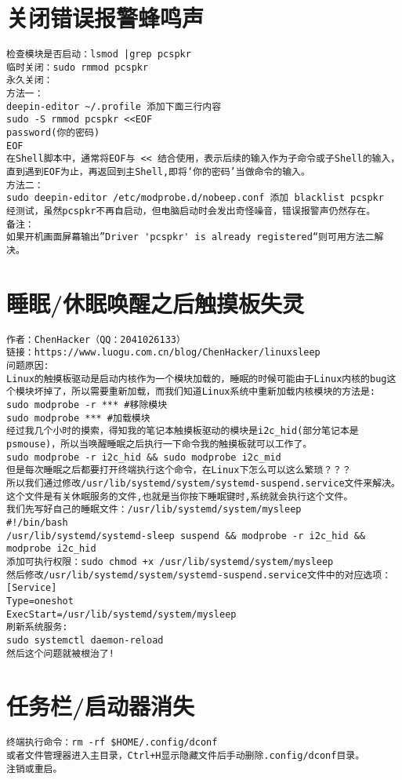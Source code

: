 \documentclass[a4paper,fontset=fandol,zihao=-4,linespread=1.2]{ctexbook}
\begin{document}
\section{关闭错误报警蜂鸣声}
\begin{lstlisting}
检查模块是否启动：lsmod |grep pcspkr
临时关闭：sudo rmmod pcspkr
永久关闭：
方法一：
deepin-editor ~/.profile 添加下面三行内容
sudo -S rmmod pcspkr <<EOF
password(你的密码)
EOF
在Shell脚本中，通常将EOF与 << 结合使用，表示后续的输入作为子命令或子Shell的输入，直到遇到EOF为止，再返回到主Shell,即将‘你的密码’当做命令的输入。
方法二：
sudo deepin-editor /etc/modprobe.d/nobeep.conf 添加 blacklist pcspkr
经测试，虽然pcspkr不再自启动，但电脑启动时会发出奇怪噪音，错误报警声仍然存在。
备注：
如果开机画面屏幕输出”Driver 'pcspkr' is already registered“则可用方法二解决。
\end{lstlisting}

\section{睡眠/休眠唤醒之后触摸板失灵}
\begin{lstlisting}
作者：ChenHacker（QQ：2041026133）
链接：https://www.luogu.com.cn/blog/ChenHacker/linuxsleep
问题原因:
Linux的触摸板驱动是启动内核作为一个模块加载的，睡眠的时候可能由于Linux内核的bug这个模块坏掉了，所以需要重新加载，而我们知道Linux系统中重新加载内核模块的方法是:
sudo modprobe -r *** #移除模块
sudo modprobe *** #加载模块
经过我几个小时的摸索，得知我的笔记本触摸板驱动的模块是i2c_hid(部分笔记本是psmouse)，所以当唤醒睡眠之后执行一下命令我的触摸板就可以工作了。
sudo modprobe -r i2c_hid && sudo modprobe i2c_mid
但是每次睡眠之后都要打开终端执行这个命令，在Linux下怎么可以这么繁琐？？？
所以我们通过修改/usr/lib/systemd/system/systemd-suspend.service文件来解决。
这个文件是有关休眠服务的文件,也就是当你按下睡眠键时,系统就会执行这个文件。
我们先写好自己的睡眠文件：/usr/lib/systemd/system/mysleep
#!/bin/bash
/usr/lib/systemd/systemd-sleep suspend && modprobe -r i2c_hid && modprobe i2c_hid
添加可执行权限：sudo chmod +x /usr/lib/systemd/system/mysleep
然后修改/usr/lib/systemd/system/systemd-suspend.service文件中的对应选项：
[Service]
Type=oneshot
ExecStart=/usr/lib/systemd/system/mysleep
刷新系统服务:
sudo systemctl daemon-reload
然后这个问题就被根治了!
\end{lstlisting}

\section{任务栏/启动器消失} \label{section:dock_disappear}
\begin{lstlisting}
终端执行命令：rm -rf $HOME/.config/dconf
或者文件管理器进入主目录，Ctrl+H显示隐藏文件后手动删除.config/dconf目录。
注销或重启。
\end{lstlisting}
\end{document}
